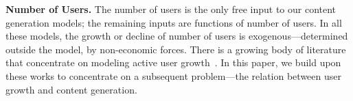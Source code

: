 \textbf{Number of Users.} The number of users is the only free input to our content generation models; the remaining inputs are functions of number of users. In all these models, the growth or decline of number of users is exogenous---determined outside the model, by non-economic forces. There is a growing body of literature that concentrate on modeling active user growth~\cite{Ribeiro2014}. In this paper, we build upon these works to concentrate on a subsequent problem---the relation between user growth and content generation.



